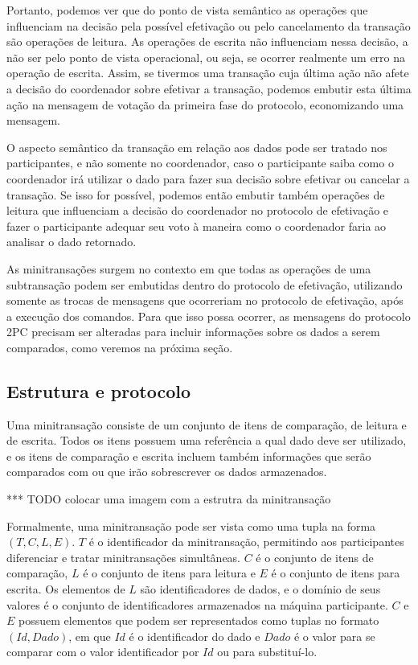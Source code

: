 \documentclass[11pt,twoside,a4paper]{book}
\begin{document}
Portanto, podemos ver que do ponto de vista semântico as operações que influenciam na decisão pela possível efetivação ou pelo cancelamento da transação são operações de leitura. As operações de escrita não influenciam nessa decisão, a não ser pelo ponto de vista operacional, ou seja, se ocorrer realmente um erro na operação de escrita. Assim, se tivermos uma transação cuja última ação não afete a decisão do coordenador sobre efetivar a transação, podemos embutir esta última ação na mensagem de votação da primeira fase do protocolo, economizando uma mensagem.

O aspecto semântico da transação em relação aos dados pode ser tratado nos participantes, e não somente no coordenador, caso o participante saiba como o coordenador irá utilizar o dado para fazer sua decisão sobre efetivar ou cancelar a transação. Se isso for possível, podemos então embutir também operações de leitura que influenciam a decisão do coordenador no protocolo de efetivação e fazer o participante adequar seu voto à maneira como o coordenador faria ao analisar o dado retornado.

As minitransações surgem no contexto em que todas as operações de uma subtransação podem ser embutidas dentro do protocolo de efetivação, utilizando somente as trocas de mensagens que ocorreriam no protocolo de efetivação, após a execução dos comandos. Para que isso possa ocorrer, as mensagens do protocolo 2PC precisam ser alteradas para incluir informações sobre os dados a serem comparados, como veremos na próxima seção.

\subsection{Estrutura e protocolo}
\label{subsec:estrutura-minitransacoes}
Uma minitransação consiste de um conjunto de itens de comparação, de leitura e de escrita. Todos os itens possuem uma referência a qual dado deve ser utilizado, e os itens de comparação e escrita incluem também informações que serão comparados com ou que irão sobrescrever os dados armazenados. 

*** TODO colocar uma imagem com a estrutra da minitransação

Formalmente, uma minitransação pode ser vista como uma tupla na forma \( (T, C, L, E) \). \(T\) é o identificador da minitransação, permitindo aos participantes diferenciar e tratar minitransações simultâneas. \(C\) é o conjunto de itens de comparação, \(L\) é o conjunto de itens para leitura e \(E\) é o conjunto de itens para escrita. Os elementos de \(L\) são identificadores de dados, e o domínio de seus valores é o conjunto de identificadores armazenados na máquina participante. \(C\) e \(E\) possuem elementos que podem ser representados como tuplas no formato \((Id, Dado)\), em que \(Id\) é o identificador do dado e \(Dado\) é o valor para se comparar com o valor identificador por $Id$ ou para substituí-lo.
\end{document}
